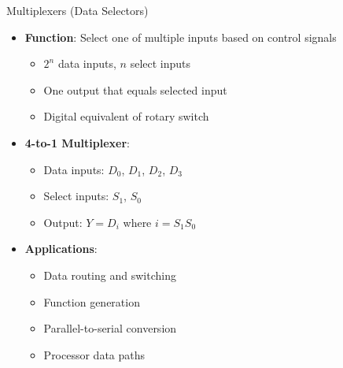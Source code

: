 \documentclass[aspectratio=169,11pt]{beamer}
\newcommand{\concept}[1]{\textbf{\color{accentcolor}#1}}
\begin{document}
\begin{frame}{Multiplexers (Data Selectors)}
\begin{itemize}
\item \concept{Function}: Select one of multiple inputs based on control signals
\begin{itemize}
\item $2^n$ data inputs, $n$ select inputs
\item One output that equals selected input
\item Digital equivalent of rotary switch
\end{itemize}
\vspace{0.5cm}
\item \concept{4-to-1 Multiplexer}:
\begin{itemize}
\item Data inputs: $D_0$, $D_1$, $D_2$, $D_3$
\item Select inputs: $S_1$, $S_0$
\item Output: $Y = D_i$ where $i = S_1S_0$
\end{itemize}
\vspace{0.3cm}
\item \concept{Applications}:
\begin{itemize}
\item Data routing and switching
\item Function generation
\item Parallel-to-serial conversion
\item Processor data paths
\end{itemize}
\end{itemize}
\end{frame}
\end{document}
